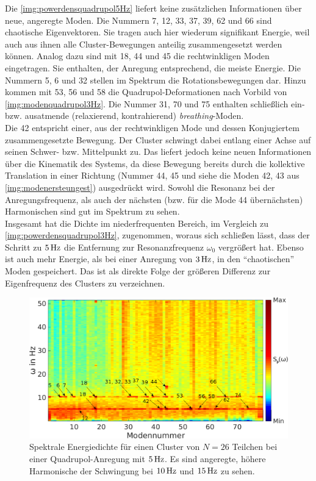 \documentclass[numbers=noenddot,a4paper,notitlepage,twoside,BCOR15mm]{scrbook}
\newcommand{\ix}[1]{_\text{#1}}
\newcommand{\tilt}[1]{\textit{#1}}
\begin{document}
						Die \autoref{img:powerdensquadrupol5Hz} liefert keine zusätzlichen Informationen über neue, angeregte Moden. Die Nummern 7, 12, 33, 37, 39, 62 und 66 sind chaotische Eigenvektoren. Sie tragen auch hier wiederum signifikant Energie, weil auch aus ihnen alle Cluster-Bewegungen anteilig zusammengesetzt werden können. Analog dazu sind mit 18, 44 und 45 die rechtwinkligen Moden eingetragen. Sie enthalten, der Anregung entsprechend, die meiste Energie. Die Nummern 5, 6 und 32 stellen im Spektrum die Rotationsbewegungen dar.  Hinzu kommen mit 53, 56 und 58 die Quadrupol-Deformationen nach Vorbild von \autoref{img:modenquadrupol3Hz}. Die Nummer 31, 70 und 75 enthalten schließlich ein- bzw. ausatmende (relaxierend, kontrahierend) \tilt{breathing}-Moden.\\
						Die 42 entspricht einer, aus der rechtwinkligen Mode und dessen Konjugiertem zusammengesetzte Bewegung. Der Cluster schwingt dabei entlang einer Achse auf seinen Schwer- bzw. Mittelpunkt zu. Das liefert jedoch keine neuen Informationen über die Kinematik des Systems, da diese Bewegung bereits durch die kollektive Translation in einer Richtung (Nummer 44, 45 und siehe die Moden 42, 43 aus \autoref{img:modenersteungest}) ausgedrückt wird. Sowohl die Resonanz bei der Anregungsfrequenz, als auch der nächsten (bzw. für die Mode 44 übernächsten) Harmonischen sind gut im Spektrum zu sehen.\\
						Insgesamt hat die Dichte im niederfrequenten Bereich, im Vergleich zu \autoref{img:powerdensquadrupol3Hz}, zugenommen, woraus sich schließen lässt, dass der Schritt zu $\unit[5]{Hz}$ die Entfernung zur Resonanzfrequenz $\omega\ix{0}$ vergrößert hat. Ebenso ist auch mehr Energie, als bei einer Anregung von $\unit[3]{Hz}$, in den "`chaotischen"' Moden gespeichert. Das ist als direkte Folge der größeren Differenz zur Eigenfrequenz des Clusters zu verzeichnen. 

							\begin{figure}[!t]
								\centering
								\includegraphics[width=\textwidth]{figs/auswertung/manipulation/quadrupol5Hzpowerdens.png}
								\caption{Spektrale Energiedichte für einen Cluster von $N=26$ Teilchen bei einer Quadrupol-Anregung mit $\unit[5]{Hz}$. Es sind angeregte, höhere Harmonische der Schwingung bei $\unit[10]{Hz}$  und $\unit[15]{Hz}$ zu sehen.}\label{img:powerdensquadrupol5Hz}
							\end{figure}
\end{document}

